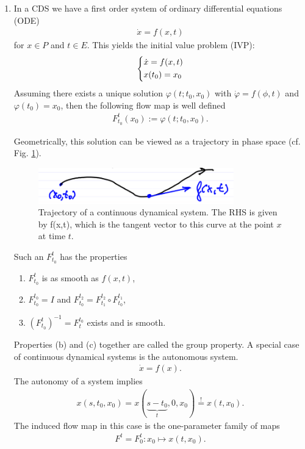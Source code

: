 \begin{enumerate}
\item In a CDS we have a first order system of ordinary differential equations (ODE)
	\begin{align}
		\boxed{
			\dot{ {x}} = f( {x},t)
		}
	\end{align}
	for $ {x}\in P$ and $t \in E$. This yields the initial value problem (IVP):
	\begin{align}
		\begin{dcases}
			\dot{ {x}} = f( {x},t) \\
			 {x}(t_0) =  {x}_0
		\end{dcases}
	\end{align}
	Assuming there exists a unique solution $\varphi(t; t_0,  {x}_0)$ with $\dot{\varphi} = f(\phi,t)$ and $\varphi(t_0)=  {x}_0$, then the following flow map is well defined
	\begin{align}
		\boxed{
		F_{t_0}^{t}( {x}_0) := \varphi(t; t_0,  {x}_0).}
	\end{align}

Geometrically, this solution can be viewed as a trajectory in phase space (cf. Fig. \ref{fig:cds_traj}).
	\begin{figure}[h!]
	\centering
	\includegraphics[width = 0.8\textwidth]{figures/intro/2CDS.png}
	\caption{Trajectory of a continuous dynamical system. The RHS is given by f(x,t), which is the tangent vector to this curve at the point $x$ at time $t$.} \label{fig:cds_traj}
	\end{figure}
	
	Such an $F_{t_0}^{t}$ has the properties
	\begin{enumerate}
		\item $F_{t_0}^{t}$ is as smooth as $f( {x},t)$,
		\item $F_{t_0}^{t_0} = I$ and $F_{t_0}^{t_2} = F_{t_1}^{t_2} \circ F_{t_0}^{t_1}$,
		\item $\left(F_{t_0}^{t}\right)^{-1} = F_{t}^{t_0}$ exists and is smooth.
\end{enumerate}
Properties (b) and (c) together are called the group property. A special case of continuous dynamical systems is the autonomous system.
\begin{align}
	\boxed{\dot{ {x}} = f( {x}).}	
\end{align}
The autonomy of a system implies
\begin{align}
	 {x}(s,t_0,  {x}_0) =  {x}(\underbrace{s-t_0}_{t}, 0,  {x}_0) \stackrel{!}{=}  {x}(t, {x}_0).
\end{align}
The induced flow map in this case is the one-parameter family of maps
\begin{align}
	\boxed{ F^{t} = F_{0}^{t}:  {x}_0 \mapsto  {x}(t, {x}_0).}
\end{align}

\end{enumerate}
